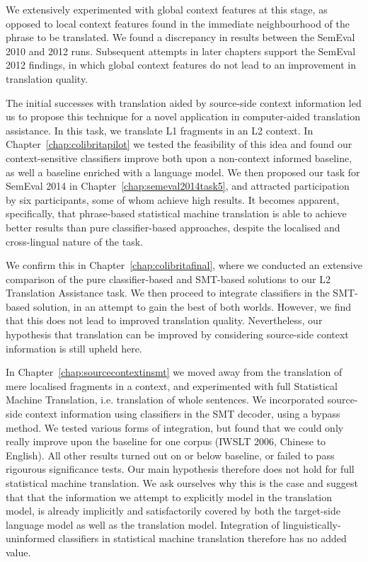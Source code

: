 We extensively experimented with global context features at this stage, as
opposed to local context features found in the immediate neighbourhood of the
phrase to be translated. We found a discrepancy in results between the SemEval
2010 and 2012 runs. Subsequent attempts in later chapters support the SemEval
2012 findings, in which global context features do not lead to an improvement
in translation quality.

The initial successes with translation aided by source-side context information
led us to propose this technique for a novel application in computer-aided translation
assistance. In this task, we translate L1 fragments in an L2 context.
In Chapter~\ref{chap:colibritapilot} we tested the feasibility of this idea and
found our context-sensitive classifiers improve both upon a non-context informed
baseline, as well a baseline enriched with a language model. We then
proposed our task for SemEval 2014 in Chapter~\ref{chap:semeval2014task5}, and attracted
participation by six participants, some of whom achieve high results. It
becomes apparent, specifically, that phrase-based statistical machine translation is able to
achieve better results than pure classifier-based approaches, despite the
localised and cross-lingual nature of the task.

We confirm this in Chapter~\ref{chap:colibritafinal}, where we conducted an
extensive comparison of the pure classifier-based and SMT-based solutions to
our L2 Translation Assistance task. We then proceed to integrate classifiers in
the SMT-based solution, in an attempt to gain the best of both worlds. However,
we find that this does not lead to improved translation quality. Nevertheless,
our hypothesis that translation can be improved by considering source-side
context information is still upheld here.

In Chapter~\ref{chap:sourcecontextinsmt} we moved away from the translation of
mere localised fragments in a context, and experimented with full Statistical
Machine Translation, i.e. translation of whole sentences. We incorporated
source-side context information using classifiers in the SMT decoder, using a
bypass method. We tested various forms of integration, but found that we could
only really improve upon the baseline for one corpus (IWSLT 2006, Chinese to
English). All other results turned out on or below baseline, or failed to pass
rigourous significance tests. Our main hypothesis therefore does not hold for
full statistical machine translation. We ask ourselves why this is the case and
suggest that that the information we attempt to explicitly model in the
translation model, is already implicitly and satisfactorily covered by both the
target-side language model as well as the translation model. Integration of
linguistically-uninformed classifiers in statistical machine translation
therefore has no added value.

